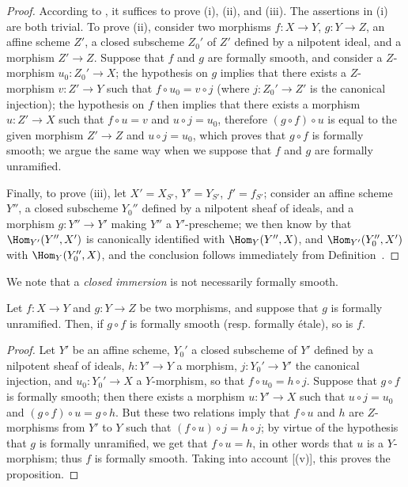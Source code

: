 \begin{proof}
According to , it suffices to prove (i), (ii), and (iii). 
The assertions in (i) are both trivial.
To prove (ii), consider two morphisms $f:X\to Y$, $g:Y\to Z$, an affine scheme $Z'$, a closed subscheme $Z_0'$ of $Z'$ defined by a nilpotent ideal, and a morphism $Z'\to Z$.
Suppose that $f$ and $g$ are formally smooth, and consider a $Z$-morphism
$u_0:Z_0'\to X$;
the hypothesis on $g$ implies that there exists a $Z$-morphism $v:Z'\to Y$ such that $f\circ u_0=v\circ j$ (where $j:Z_0'\to Z'$ is the canonical injection);
the hypothesis on $f$ then implies that there exists a morphism $u:Z'\to X$ such that $f\circ u=v$ and $u\circ j=u_0$, therefore $(g\circ f)\circ u$ is equal to the given morphism $Z'\to Z$ and $u\circ j=u_0$, which proves that $g\circ f$ is formally smooth;
we argue the same way when we suppose that $f$ and $g$ are formally unramified.

Finally, to prove (iii), let $X'=X_{S'}$, $Y'=Y_{S'}$, $f'=f_{S'}$;
consider an affine scheme $Y''$, a closed subscheme $Y_0''$ defined by a nilpotent sheaf of ideals, and a morphism $g:Y''\to Y'$ making $Y''$ a $Y'$-prescheme;
we then know by  that $\Hom_{Y'}(Y'',X')$ is canonically identified with $\Hom_Y(Y'',X)$, and $\Hom_{Y'}(Y_0'',X')$ with $\Hom_Y(Y_0'',X)$, and the conclusion follows immediately from Definition~.
\end{proof}

We note that a \emph{closed immersion} is not necessarily formally smooth.
\begin{proposition}[17.1.4]
\label{IV.17.1.4}
Let $f:X\to Y$ and $g:Y\to Z$ be two morphisms, and suppose that $g$ is formally unramified.
Then, if $g\circ f$ is formally smooth (resp. formally \'etale), so is $f$.
\end{proposition}

\begin{proof}
Let $Y'$ be an affine scheme, $Y_0'$ a closed subscheme of $Y'$ defined by a nilpotent sheaf of ideals, $h:Y'\to Y$ a morphism, $j:Y_0'\to Y'$ the canonical injection, and $u_0:Y_0'\to X$ a $Y$-morphism, so that $f\circ u_0=h\circ j$.
Suppose that $g\circ f$ is formally smooth;
then there exists a morphism $u:Y'\to X$ such that $u\circ j=u_0$ and $(g\circ f)\circ u=g\circ h$. 
But these two relations imply that $f\circ u$ and $h$ are $Z$-morphisms from $Y'$ to $Y$ such that $(f\circ u)\circ j=h\circ j$;
by virtue of the hypothesis that $g$ is formally unramified, we get that $f\circ u=h$, in other words that $u$ is a $Y$-morphism;
thus $f$ is formally smooth.
Taking into account [(v)], this proves the proposition.
\end{proof}

